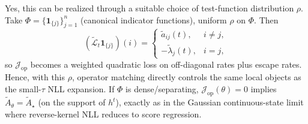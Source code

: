 \documentclass[11pt]{article}
\begin{document}
Yes, this can be realized through a suitable choice of test-function distribution $\rho$.
Take $\Phi=\{\mathbf 1_{\{j\}}\}_{j=1}^n$ (canonical indicator functions), uniform $\rho$ on $\Phi$.
Then
\[
(\widetilde{\mathcal L}_t\mathbf 1_{\{j\}})(i)=
\begin{cases}
\widetilde a_{ij}(t), & i\neq j,\\
-\widetilde\lambda_j(t), & i=j,
\end{cases}
\]
so $\mathcal J_{\mathrm{op}}$ becomes a weighted quadratic loss on off-diagonal rates plus escape rates.
Hence, with this $\rho$, operator matching directly controls the same local objects as the small-$\tau$ NLL expansion.
If $\Phi$ is dense/separating, $\mathcal J_{\mathrm{op}}(\theta)=0$ implies $\widetilde A_\theta=\widetilde A_\star$ (on the support of $h^t$), exactly as in the Gaussian continuous-state limit where reverse-kernel NLL reduces to score regression.




\end{document}
